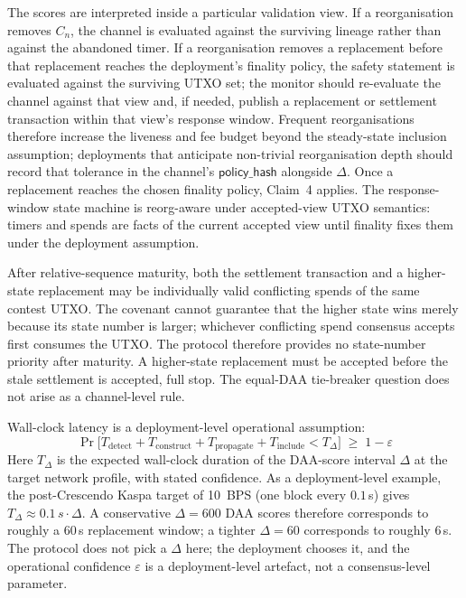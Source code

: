 \documentclass[10pt,a4paper]{article}
\begin{document}
The scores are interpreted inside a particular validation view. If a reorganisation removes $C_n$, the channel is evaluated against the surviving lineage rather than against the abandoned timer. If a reorganisation removes a replacement before that replacement reaches the deployment's finality policy, the safety statement is evaluated against the surviving UTXO set; the monitor should re-evaluate the channel against that view and, if needed, publish a replacement or settlement transaction within that view's response window. Frequent reorganisations therefore increase the liveness and fee budget beyond the steady-state inclusion assumption; deployments that anticipate non-trivial reorganisation depth should record that tolerance in the channel's $\mathsf{policy\_hash}$ alongside $\Delta$. Once a replacement reaches the chosen finality policy, Claim~4 applies. The response-window state machine is reorg-aware under accepted-view UTXO semantics: timers and spends are facts of the current accepted view until finality fixes them under the deployment assumption.

After relative-sequence maturity, both the settlement transaction and a higher-state replacement may be individually valid conflicting spends of the same contest UTXO. The covenant cannot guarantee that the higher state wins merely because its state number is larger; whichever conflicting spend consensus accepts first consumes the UTXO. The protocol therefore provides no state-number priority after maturity. A higher-state replacement must be accepted before the stale settlement is accepted, full stop. The equal-DAA tie-breaker question does not arise as a channel-level rule.

Wall-clock latency is a deployment-level operational assumption:
\[
  \Pr\!\bigl[T_{\mathrm{detect}} + T_{\mathrm{construct}} + T_{\mathrm{propagate}} + T_{\mathrm{include}} < T_{\Delta}\bigr]
   \;\ge\; 1 - \varepsilon
\]
Here $T_{\Delta}$ is the expected wall-clock duration of the DAA-score interval $\Delta$ at the target network profile, with stated confidence. As a deployment-level example, the post-Crescendo Kaspa target of \mbox{10 BPS} (one block every $0.1$\,s) gives $T_{\Delta} \approx 0.1\,s \cdot \Delta$. A conservative $\Delta = 600$ DAA scores therefore corresponds to roughly a $60$\,s replacement window; a tighter $\Delta = 60$ corresponds to roughly $6$\,s. The protocol does not pick a $\Delta$ here; the deployment chooses it, and the operational confidence $\varepsilon$ is a deployment-level artefact, not a consensus-level parameter.
\end{document}
